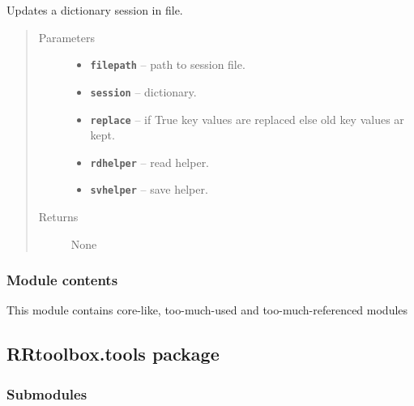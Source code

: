 \documentclass[letterpaper,10pt,english]{sphinxmanual}
\begin{document}
\begin{fulllineitems}
\label{RRtoolbox.lib:RRtoolbox.lib.session.updateSession}
Updates a dictionary session in file.
\begin{quote}\begin{description}
\item[{Parameters}] \leavevmode\begin{itemize}
\item {} 
\textbf{\texttt{filepath}} -- path to session file.

\item {} 
\textbf{\texttt{session}} -- dictionary.

\item {} 
\textbf{\texttt{replace}} -- if True key values are replaced else old key values ar kept.

\item {} 
\textbf{\texttt{rdhelper}} -- read helper.

\item {} 
\textbf{\texttt{svhelper}} -- save helper.

\end{itemize}

\item[{Returns}] \leavevmode
None

\end{description}\end{quote}

\end{fulllineitems}



\subsubsection{Module contents}
\label{RRtoolbox.lib:module-RRtoolbox.lib}\label{RRtoolbox.lib:module-contents}
This module contains core-like, too-much-used and too-much-referenced modules


\subsection{RRtoolbox.tools package}
\label{RRtoolbox.tools::doc}\label{RRtoolbox.tools:rrtoolbox-tools-package}

\subsubsection{Submodules}
\label{RRtoolbox.tools:submodules}
\end{document}
